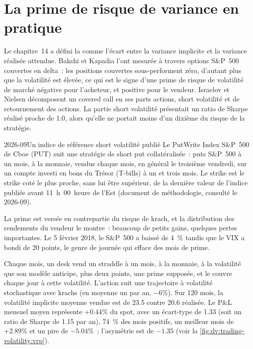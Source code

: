 \section{La prime de risque de variance en pratique}

Le chapitre~14 a défini la  comme l'écart entre la variance implicite et la variance réalisée attendue. Bakshi et Kapadia l'ont mesurée à travers
options S\&P~500 couvertes en delta~: les positions couvertes sous-performent zéro, d'autant plus que la volatilité est élevée, ce qui est le signe d'une prime de risque de volatilité de marché négative
pour l'acheteur, et positive pour le vendeur. Israelov et Nielsen décomposent un covered call en ses parts actions, short volatilité
et de retournement des actions. La partie short volatilité présentait un ratio de Sharpe réalisé proche de 1.0, alors qu'elle ne portait
moins d'un dixième du risque de la stratégie.

\begin{dated}{2026-09}{Un indice de référence short volatilité publié}\label{dat:dv:trading-volatility:put}
Le PutWrite Index S\&P~500 de Cboe (PUT) suit une stratégie de short put collatéralisée~: puts S\&P~500 à un mois, à la monnaie, vendus chaque mois, en général le
troisième vendredi, sur un compte investi en bons du Trésor (T-bills) à un et trois mois. Le strike est le strike coté le plus proche, sans lui être supérieur, de la dernière
valeur de l'indice publiée avant 11~h~00\ heure de l'Est (document de méthodologie, consulté le 2026-09).
\end{dated}

La prime est versée en contrepartie du risque de krach, et la distribution des rendements du vendeur le montre~: beaucoup de petits gains, quelques pertes importantes. Le 5 février
2018, le S\&P~500 a baissé de 4~\% tandis que le VIX a bondi de 20 points, le genre de journée qui efface des mois de prime.

\begin{example}\label{ex:dv:trading-volatility:vrp}
Chaque mois, un desk vend un straddle à un mois, à la monnaie, à la volatilité que son modèle anticipe, plus deux points, une prime supposée, et
le couvre chaque jour à cette volatilité. L'action suit une trajectoire à volatilité stochastique avec krachs (en moyenne un par an, $-6\%$). Sur 120 mois, la volatilité implicite moyenne vendue
est de 23.5 contre 20.6 réalisée. Le P\&L mensuel moyen représente $+0.44\%$ du spot, avec un écart-type de 1.33 (soit un
ratio de Sharpe de 1.15 par an), 74~\% des mois positifs, un meilleur mois de $+2.89\%$ et un pire de $-5.04\%$~; l'asymétrie est de $-1.35$
(voir la \cref{fig:dv:trading-volatility:vrp}).
\end{example}

